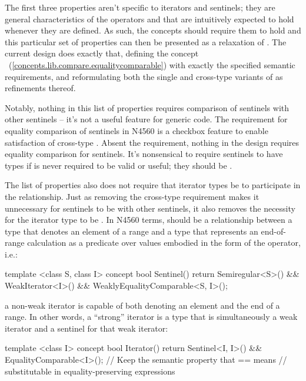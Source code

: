 \pnum
The first three properties aren't specific to iterators and sentinels; they are
general characteristics of the operators \tcode{==} and \tcode{!=} that are
intuitively expected to hold whenever they are defined. As such, the
 concepts should require them to hold and this
particular set of properties can then be presented as a relaxation of
. The current design does exactly that,
defining the concept
~(\ref{concepts.lib.compare.equalitycomparable})
with exactly the specified semantic requirements, and reformulating both the
single and cross-type variants of  as refinements
thereof.

\pnum
Notably, nothing in this list of properties requires comparison of sentinels
with other sentinels -- it's not a useful feature for generic code. The
requirement for equality comparison of sentinels in N4560 is a checkbox feature
to enable satisfaction of cross-type . Absent the
 requirement, nothing in the design requires equality
comparison for sentinels. It's nonsensical to require sentinels to have
 types if \tcode{==} is never required to be valid or useful;
they should be .

\pnum
The list of properties also does not require that iterator types be
 to participate in the  relationship.
Just as removing the cross-type  requirement
makes it unnecessary for sentinels to be  with
other sentinels, it also removes the necessity for the iterator type to be
. In N4560 terms,  should be a
relationship between a  type that denotes an element of a
range and a  type that represents an end-of-range calculation
as a predicate over  values embodied in the form of the
\tcode{==} operator, i.e.:
\begin{codeblock}
template <class S, class I>
concept bool Sentinel() {
  return Semiregular<S>() && WeakIterator<I>() &&
    WeaklyEqualityComparable<S, I>();
}
\end{codeblock}
a non-weak iterator is capable of both denoting an element and the end of a
range. In other words, a ``strong'' iterator is a type that is simultaneously a
weak iterator and a sentinel for that weak iterator:
\begin{codeblock}
template <class I>
concept bool Iterator() {
  return Sentinel<I, I>() &&
    EqualityComparable<I>(); // Keep the semantic property that == means
                             // substitutable in equality-preserving expressions
}
\end{codeblock}

